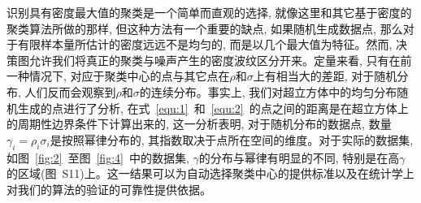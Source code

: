 识别具有密度最大值的聚类是一个简单而直观的选择, 就像这里和其它基于密度的聚类算法\cite{Ester1996,Fukunaga1975}所做的那样, 但这种方法有一个重要的缺点, 如果随机生成数据点, 那么对于有限样本量所估计的密度远远不是均匀的, 而是以几个最大值为特征。然而, 决策图允许我们将真正的聚类与噪声产生的密度波纹区分开来。定量来看, 只有在前一种情况下, 对应于聚类中心的点与其它点在$\rho$和$\sigma$上有相当大的差距, 对于随机分布, 人们反而会观察到$\rho$和$\sigma$的连续分布。事实上, 我们对超立方体中的均匀分布随机生成的点进行了分析, 在式~\ref{equ:1}~和~\ref{equ:2}~的点之间的距离是在超立方体上的周期性边界条件下计算出来的, 这一分析表明, 对于随机分布的数据点, 数量$\gamma_i= \rho_i\sigma_i$是按照幂律分布的, 其指数取决于点所在空间的维度。对于实际的数据集, 如图~\ref{fig:2}~至图~\ref{fig:4}~中的数据集, $\gamma$的分布与幂律有明显的不同, 特别是在高$\gamma$的区域(图~S11)上。这一结果可以为自动选择聚类中心的提供标准以及在统计学上对我们的算法的验证的可靠性提供依据。


